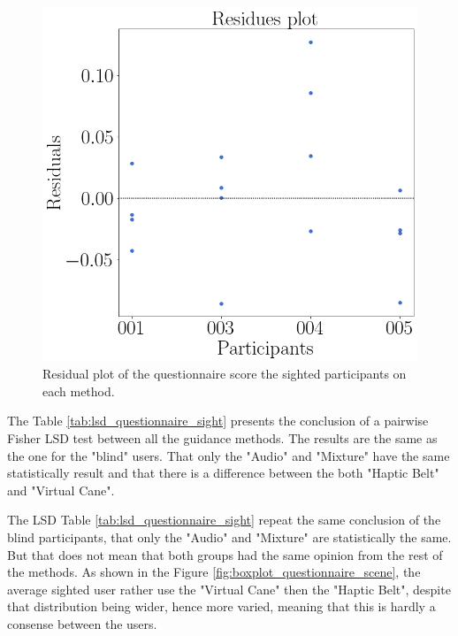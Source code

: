 \begin{figure}[!htb]
\begin{minipage}{0.45\textwidth}
        \includegraphics[width = 0.8\linewidth]{Resultados/Questionario/Figuras/png/residplot_questionnaires_sight.png}
        \caption{Residual plot of the questionnaire score the sighted participants on each method.}
        \label{fig:residplot_questionnaires_sight}
    \end{minipage}
\end{figure}

The Table \ref{tab:lsd_questionnaire_sight} presents the conclusion of a pairwise Fisher LSD test between all the guidance methods. The results are the same as the one for the "blind" users. That only the "Audio" and "Mixture" have the same statistically result and that there is a difference between the both "Haptic Belt" and "Virtual Cane".



The LSD Table \ref{tab:lsd_questionnaire_sight} repeat the same conclusion of the blind participants, that only the "Audio" and "Mixture" are statistically the same. But that does not mean that both groups had the same opinion from the rest of the methods. As shown in the Figure \ref{fig:boxplot_questionnaire_scene}, the average sighted user rather use the "Virtual Cane" then the "Haptic Belt", despite that distribution being wider, hence more varied, meaning that this is hardly a consense between the users.

\FloatBarrier